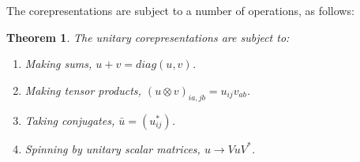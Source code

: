\documentclass[12pt]{amsbook}
\newtheorem{theorem}{Theorem}[chapter]
\begin{document}
The corepresentations are subject to a number of operations, as follows:


\begin{theorem}
The unitary corepresentations are subject to:
\begin{enumerate}
\item Making sums, $u+v=diag(u,v)$.

\item Making tensor products, $(u\otimes v)_{ia,jb}=u_{ij}v_{ab}$.

\item Taking conjugates, $\bar{u}=(u_{ij}^*)$.

\item Spinning by unitary scalar matrices, $u\to VuV^*$.
\end{enumerate}
\end{theorem}
\end{document}
